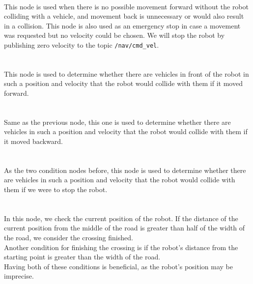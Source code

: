     \\
        This node is used when there is no possible movement forward without the robot colliding with a vehicle, and movement back is unnecessary or would also result in a collision. This node is also used as an emergency stop in case a movement was requested but no velocity could be chosen. We will stop the robot by publishing zero velocity to the topic \texttt{/nav/cmd\_vel}.\\\\
    \\
        This node is used to determine whether there are vehicles in front of the robot in such a position and velocity that the robot would collide with them if it moved forward.\\\\
    \\
        Same as the previous node, this one is used to determine whether there are vehicles in such a position and velocity that the robot would collide with them if it moved backward.\\\\
    \\
        As the two condition nodes before, this node is used to determine whether there are vehicles in such a position and velocity that the robot would collide with them if we were to stop the robot.\\\\
    \\
        In this node, we check the current position of the robot. If the distance of the current position from the middle of the road is greater than half of the width of the road, we consider the crossing finished.\\
        Another condition for finishing the crossing is if the robot's distance from the starting point is greater than the width of the road.\\
        Having both of these conditions is beneficial, as the robot's position may be imprecise.
